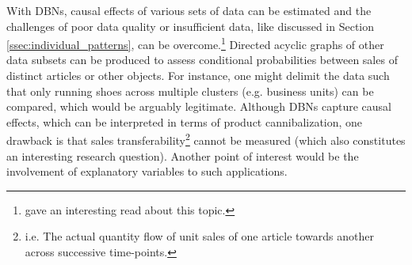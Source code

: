 With \acp{DBN}, causal effects of various sets of data can be estimated and the challenges of poor data quality or insufficient data, like discussed in Section \ref{ssec:individual_patterns}, can be overcome.\footnote{\cite{bn_advantages} gave an interesting read about this topic.} Directed acyclic graphs of other data subsets can be produced to assess conditional probabilities between sales of distinct articles or other objects. For instance, one might delimit the data such that only running shoes across multiple clusters (e.g. business units) can be compared, which would be arguably legitimate. Although \acp{DBN} capture causal effects, which can be interpreted in terms of product cannibalization, one drawback is that sales transferability\footnote{i.e. The actual quantity flow of unit sales of one article towards another across successive time-points.} cannot be measured (which also constitutes an interesting research question). Another point of interest would be the involvement of explanatory variables to such applications.

